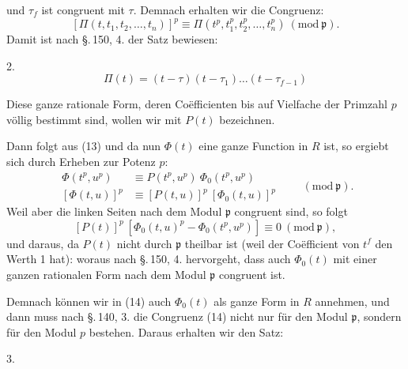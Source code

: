 und $\tau_f$ ist congruent mit $\tau$. Demnach erhalten wir die
Congruenz:
\[
[\Pi(t, t_1, t_2, \ldots, t_n)]^p \equiv \Pi(t^p, t_1^p, t_2^p, \ldots, t_n^p)\ (\mathrm{mod}\ \mathfrak p).
\]
Damit ist nach \S.\,150, 4. der Satz bewiesen:

2. 
\[
\Pi(t) = (t - \tau)(t - \tau_1) \ldots (t - \tau_{f-1})
\]

Diese ganze rationale Form, deren Coëfficienten bis auf Vielfache der
Primzahl $p$ völlig bestimmt sind, wollen wir mit $P(t)$ bezeichnen.

Dann folgt aus (13)
und da nun $\Phi(t)$ eine ganze Function in $R$ ist, so ergiebt sich
durch Erheben zur Potenz $p$:
\[
\begin{aligned}
\Phi(t^p, u^p) &\equiv P(t^p, u^p)\ \Phi_0(t^p, u^p) \\
[\Phi(t, u)]^p &\equiv [P(t, u)]^p\ [\Phi_0(t, u)]^p
\end{aligned}
\qquad (\mathrm{mod}\ \mathfrak p).
\]
Weil aber die linken Seiten nach dem Modul $\mathfrak p$ congruent
sind, so folgt
\[
[P(t)]^p\ [\Phi_0(t, u)^p - \Phi_0(t^p, u^p)] \equiv 0\ (\mathrm{mod}\ \mathfrak p),
\]
und daraus, da $P(t)$ nicht durch $\mathfrak p$ theilbar ist (weil
der Coëfficient von $t^f$ den Werth 1 hat):
woraus nach \S.\,150, 4. hervorgeht, dass auch $\Phi_0(t)$ mit einer
ganzen rationalen Form nach dem Modul $\mathfrak p$ congruent ist.

Demnach können wir in (14) auch $\Phi_0(t)$ als ganze Form in $R$
annehmen, und dann muss nach \S.\,140, 3. die Congruenz (14) nicht
nur für den Modul $\mathfrak p$, sondern für den Modul $p$ bestehen.
Daraus erhalten wir den Satz:

3. 
